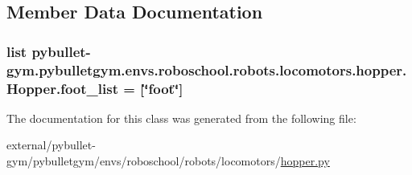 \subsection{Member Data Documentation}
\subsubsection[{\texorpdfstring{foot\+\_\+list}{foot_list}}]{\setlength{\rightskip}{0pt plus 5cm}list pybullet-\/gym.\+pybulletgym.\+envs.\+roboschool.\+robots.\+locomotors.\+hopper.\+Hopper.\+foot\+\_\+list = \mbox{[}\char`\"{}foot\char`\"{}\mbox{]}\hspace{0.3cm}{\ttfamily [static]}}\hypertarget{classpybullet-gym_1_1pybulletgym_1_1envs_1_1roboschool_1_1robots_1_1locomotors_1_1hopper_1_1_hopper_aba9ff7a855f3987689e68ce6723cc31c}{}\label{classpybullet-gym_1_1pybulletgym_1_1envs_1_1roboschool_1_1robots_1_1locomotors_1_1hopper_1_1_hopper_aba9ff7a855f3987689e68ce6723cc31c}


The documentation for this class was generated from the following file\+:\begin{DoxyCompactItemize}
\item 
external/pybullet-\/gym/pybulletgym/envs/roboschool/robots/locomotors/\hyperlink{roboschool_2robots_2locomotors_2hopper_8py}{hopper.\+py}\end{DoxyCompactItemize}

